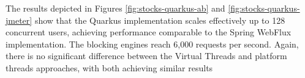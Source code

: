 \documentclass[../ppG48.tex]{subfiles}
\begin{document}
\vspace{2cm}

The results depicted in Figures \ref{fig:stocks-quarkus-ab} and \ref{fig:stocks-quarkus-jmeter} show that the Quarkus implementation scales effectively up to 128 concurrent users, achieving performance comparable to the Spring WebFlux implementation. The blocking engines reach 6,000 requests per second. Again, there is no significant difference between the Virtual Threads and platform threads approaches, with both achieving similar results
\end{document}
